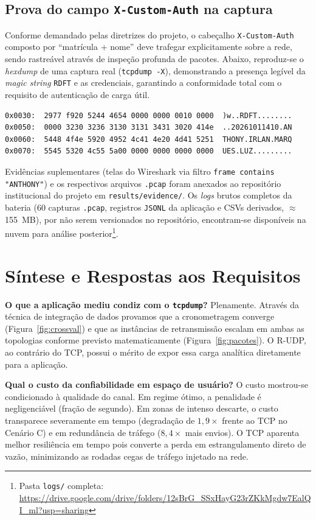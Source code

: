 \documentclass[12pt]{article}
\begin{document}
\subsection{Prova do campo \texttt{X-Custom-Auth} na captura}

Conforme demandado pelas diretrizes do projeto, o cabeçalho \texttt{X-Custom-Auth} composto 
por ``matrícula + nome'' deve trafegar explicitamente sobre a rede, sendo rastreável através 
de inspeção profunda de pacotes. Abaixo, reproduz-se o \emph{hexdump} de uma captura real 
(\texttt{tcpdump -X}), demonstrando a presença legível da \emph{magic string} \texttt{RDFT} 
e as credenciais, garantindo a conformidade total com o requisito de autenticação de carga útil.

\begin{verbatim}
0x0030:  2977 f920 5244 4654 0000 0000 0010 0000  )w..RDFT........
0x0050:  0000 3230 3236 3130 3131 3431 3020 414e  ..20261011410.AN
0x0060:  5448 4f4e 5920 4952 4c41 4e20 4d41 5251  THONY.IRLAN.MARQ
0x0070:  5545 5320 4c55 5a00 0000 0000 0000 0000  UES.LUZ.........
\end{verbatim}

Evidências suplementares (telas do Wireshark via filtro \texttt{frame contains "ANTHONY"}) e os
respectivos arquivos \texttt{.pcap} foram anexados ao repositório institucional do projeto em
\texttt{results/evidence/}. Os \emph{logs} brutos completos da bateria (60 capturas \texttt{.pcap},
registros \texttt{JSONL} da aplicação e CSVs derivados, $\approx$155~MB), por não serem versionados no
repositório, encontram-se disponíveis na nuvem para análise posterior\footnote{Pasta \texttt{logs/}
completa: \url{https://drive.google.com/drive/folders/12sBrG_SSxHayG23rZKkMgdw7EalQI_ml?usp=sharing}}.

\section{Síntese e Respostas aos Requisitos}

\textbf{O que a aplicação mediu condiz com o \texttt{tcpdump}?} Plenamente. Através da técnica de integração 
de dados provamos que a cronometragem converge (Figura~\ref{fig:crossval}) e que as instâncias de retransmissão 
escalam em ambas as topologias conforme previsto matematicamente (Figura~\ref{fig:pacotes}). O R-UDP, ao contrário 
do TCP, possui o mérito de expor essa carga analítica diretamente para a aplicação.

\textbf{Qual o custo da confiabilidade em espaço de usuário?} O custo mostrou-se condicionado à qualidade do canal. 
Em regime ótimo, a penalidade é negligenciável (fração de segundo). Em zonas de intenso descarte, o 
custo transparece severamente em tempo (degradação de $1,9\times$ frente ao TCP no Cenário C) e em redundância 
de tráfego ($8,4\times$ mais envios). O TCP aparenta melhor resiliência em tempo pois converte a perda em 
estrangulamento direto de vazão, minimizando as rodadas cegas de tráfego injetado na rede.
\end{document}
